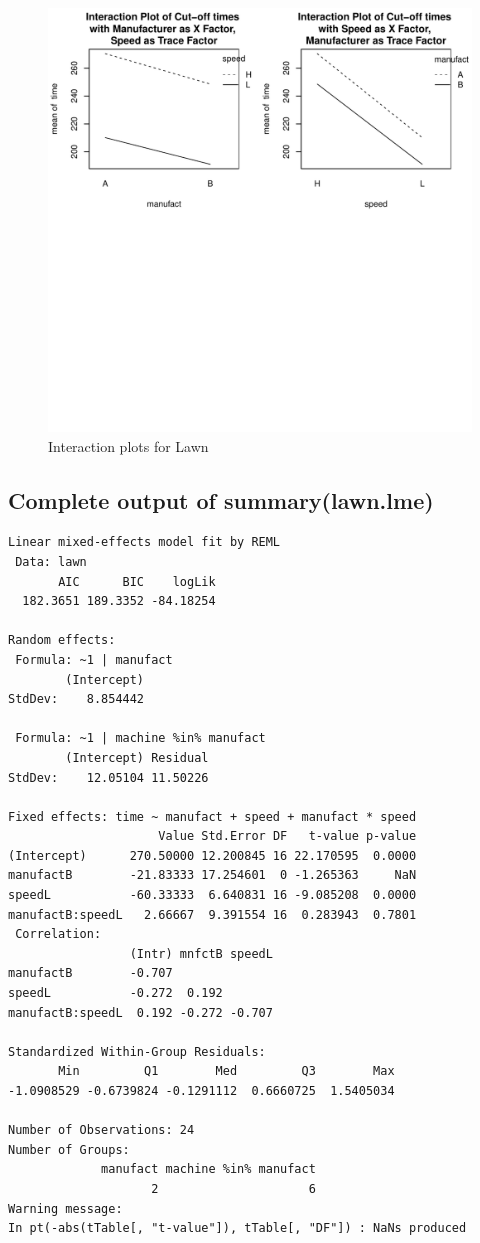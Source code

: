 \documentclass[11pt]{article}
\begin{document}
\begin{figure}[htb]
\centering
\includegraphics[width=.9\linewidth]{lawnplots2.pdf}
\caption{Interaction plots for Lawn}
\end{figure}
\subsection{Complete output of summary(lawn.lme)}
\label{sec-5-2}



\begin{verbatim}
Linear mixed-effects model fit by REML
 Data: lawn 
       AIC      BIC    logLik
  182.3651 189.3352 -84.18254

Random effects:
 Formula: ~1 | manufact
        (Intercept)
StdDev:    8.854442

 Formula: ~1 | machine %in% manufact
        (Intercept) Residual
StdDev:    12.05104 11.50226

Fixed effects: time ~ manufact + speed + manufact * speed 
                     Value Std.Error DF   t-value p-value
(Intercept)      270.50000 12.200845 16 22.170595  0.0000
manufactB        -21.83333 17.254601  0 -1.265363     NaN
speedL           -60.33333  6.640831 16 -9.085208  0.0000
manufactB:speedL   2.66667  9.391554 16  0.283943  0.7801
 Correlation: 
                 (Intr) mnfctB speedL
manufactB        -0.707              
speedL           -0.272  0.192       
manufactB:speedL  0.192 -0.272 -0.707

Standardized Within-Group Residuals:
       Min         Q1        Med         Q3        Max 
-1.0908529 -0.6739824 -0.1291112  0.6660725  1.5405034 

Number of Observations: 24
Number of Groups: 
             manufact machine %in% manufact 
                    2                     6 
Warning message:
In pt(-abs(tTable[, "t-value"]), tTable[, "DF"]) : NaNs produced
\end{verbatim}
\end{document}
